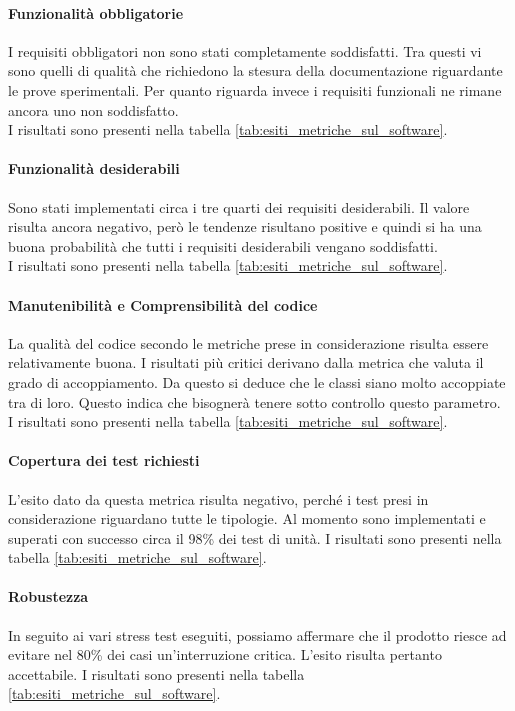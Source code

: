 \documentclass[../PianoDiQualifica.tex]{subfiles}
\begin{document}
\begin{appendices}
			\paragraph{Funzionalità obbligatorie}
			I requisiti obbligatori non sono stati completamente soddisfatti. Tra questi vi sono quelli di qualità che richiedono la stesura della documentazione riguardante le prove sperimentali. Per quanto riguarda invece i requisiti funzionali ne rimane ancora uno non soddisfatto.\\
			I risultati sono presenti nella tabella \ref{tab:esiti_metriche_sul_software}.
			
			\paragraph{Funzionalità desiderabili}
			Sono stati implementati circa i tre quarti dei requisiti desiderabili. Il valore risulta ancora negativo, però le tendenze risultano positive e quindi si ha una buona probabilità che tutti i requisiti desiderabili vengano soddisfatti.\\
			I risultati sono presenti nella tabella \ref{tab:esiti_metriche_sul_software}.
			
			\paragraph{Manutenibilità e Comprensibilità del codice}
			La qualità del codice secondo le metriche prese in considerazione risulta essere relativamente buona. I risultati più critici derivano dalla metrica che valuta il grado di accoppiamento. Da questo si deduce che le classi siano molto accoppiate tra di loro. Questo indica che bisognerà tenere sotto controllo questo parametro.\\
			I risultati sono presenti nella tabella \ref{tab:esiti_metriche_sul_software}.
			
			\paragraph{Copertura dei test richiesti}
			L'esito dato da questa metrica risulta negativo, perché i test presi in considerazione riguardano tutte le tipologie. Al momento sono implementati e superati con successo circa il 98\% dei test di unità. 
			I risultati sono presenti nella tabella \ref{tab:esiti_metriche_sul_software}.
			
			\paragraph{Robustezza}
			In seguito ai vari stress test eseguiti, possiamo affermare che il prodotto riesce ad evitare nel 80\% dei casi un'interruzione critica. L'esito risulta pertanto accettabile.
			I risultati sono presenti nella tabella \ref{tab:esiti_metriche_sul_software}.
			

\end{appendices}
\end{document}
